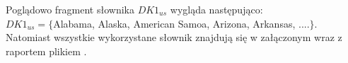\documentclass{classrep}
\begin{document}
Poglądowo fragment słownika $DK1_{us}$ wygląda następująco:\\
 $DK1_{us} = \{$Alabama, Alaska, American Samoa, Arizona, Arkansas, ....$\} $. \\
Natomiast wszystkie wykorzystane słownik znajdują się w załączonym wraz z raportem plikiem \cite{slowniki}.
\end{document}
